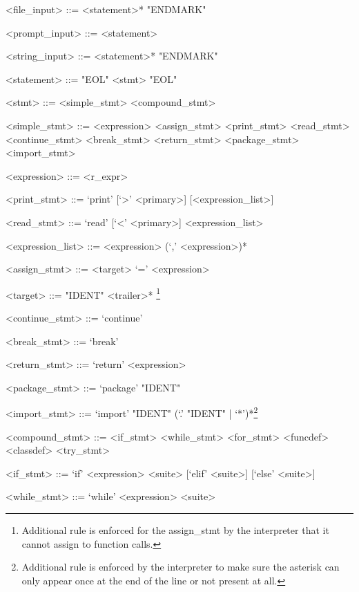 \documentclass[10pt,a4paper]{article}
\begin{document}
\setlength{\grammarparsep}{10pt plus 1pt minus 1pt} %
\setlength{\grammarindent}{12em} %
\begin{grammar}


<file_input> ::= <statement>* "ENDMARK"

<prompt_input> ::= <statement>

<string_input> ::= <statement>* "ENDMARK"

<statement> ::= "EOL" 
    \alt <stmt> "EOL"

<stmt> ::= <simple_stmt> 
    \alt <compound_stmt>
    

<simple_stmt> ::= <expression>
	\alt <assign_stmt>                    
	\alt <print_stmt>
	\alt <read_stmt>
	\alt <continue_stmt>
	\alt <break_stmt>
	\alt <return_stmt>
	\alt <package_stmt>
	\alt <import_stmt>

<expression> ::= <r_expr>
	
<print_stmt> ::= `print' [`>' <primary>] [<expression_list>]

<read_stmt> ::= `read' [`<' <primary>] <expression_list>

<expression_list> ::= <expression> (`,' <expression>)*

<assign_stmt> ::= <target> `=' <expression>

<target> ::= "IDENT" <trailer>* \footnote{Additional rule is enforced for the
assign_stmt by the interpreter that it cannot assign to function calls.}

<continue_stmt> ::= `continue'

<break_stmt> ::= `break'

<return_stmt> ::= `return' <expression>

<package_stmt> ::= `package' "IDENT"

<import_stmt> ::= `import' "IDENT" (`.' "IDENT" | `*')*\footnote{
Additional rule is enforced by the interpreter to make sure the asterisk
can only appear once at the end of the line or not present at all.}

<compound_stmt> ::= <if_stmt>
	\alt <while_stmt>
	\alt <for_stmt>
	\alt <funcdef>
    \alt <classdef>
    \alt <try_stmt>

<if_stmt> ::= `if' <expression> <suite> [`elif' <suite>] [`else' <suite>]
              
<while_stmt> ::= `while' <expression> <suite>


\end{grammar}
\end{document}
